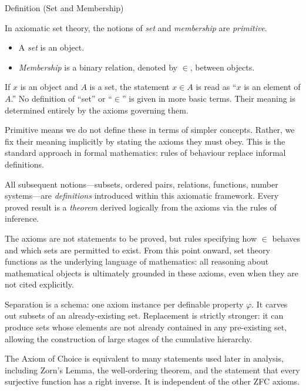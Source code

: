 \NoLocalDependencies

\begin{definitionbox}{Definition (Set and Membership)}
\begin{definition}\label{def:set-membership}
In axiomatic set theory, the notions of \emph{set} and \emph{membership} are
\emph{primitive}.

\begin{itemize}
  \item A \emph{set} is an object.
  \item \emph{Membership} is a binary relation, denoted by $\in$, between objects.
\end{itemize}

If $x$ is an object and $A$ is a set, the statement $x \in A$ is read as
``$x$ is an element of $A$.'' No definition of ``set'' or ``$\in$'' is given
in more basic terms. Their meaning is determined entirely by the axioms
governing them.
\end{definition}
\end{definitionbox}

\begin{remark*}
Primitive means we do not define these in terms of simpler concepts.
Rather, we fix their meaning implicitly by stating the axioms they must obey.
This is the standard approach in formal mathematics: rules of behaviour replace
informal definitions.
\end{remark*}

\begin{remark*}[Consequence]
All subsequent notions---subsets, ordered pairs, relations, functions,
number systems---are \emph{definitions} introduced within this axiomatic
framework. Every proved result is a \emph{theorem} derived logically from the
axioms via the rules of inference.
\end{remark*}

\begin{remark*}
The axioms are not statements to be proved, but rules specifying how $\in$
behaves and which sets are permitted to exist. From this point onward, set
theory functions as the underlying language of mathematics: all reasoning
about mathematical objects is ultimately grounded in these axioms, even when
they are not cited explicitly.
\end{remark*}

\begin{remark*}
Separation is a schema: one axiom instance per definable property $\varphi$.
It carves out subsets of an already-existing set. Replacement is strictly
stronger: it can produce sets whose elements are not already contained in any
pre-existing set, allowing the construction of large stages of the cumulative
hierarchy.
\end{remark*}

\begin{remark*}
The Axiom of Choice is equivalent to many statements used later in analysis,
including Zorn's Lemma, the well-ordering theorem, and the statement that every
surjective function has a right inverse. It is independent of the other ZFC
axioms.
\end{remark*}
